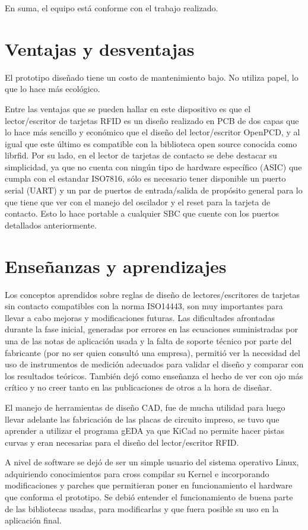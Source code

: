 En suma, el equipo está conforme con el trabajo realizado.


\section{Ventajas y desventajas}
El prototipo diseñado tiene un costo de mantenimiento bajo. No utiliza papel, lo que lo hace más ecológico.

Entre las ventajas que se pueden hallar en este dispositivo es que el lector/escritor de tarjetas RFID es un diseño realizado en PCB de dos capas que lo hace más sencillo y económico que el diseño del lector/escritor OpenPCD, y al igual que este último es compatible con la biblioteca open source conocida como librfid.
Por su lado, en el lector de tarjetas de contacto se debe destacar su simplicidad, ya que no cuenta con ningún tipo de hardware específico (ASIC) que cumpla con el estandar ISO7816, sólo es necesario tener disponible un puerto serial (UART) y un par de puertos de entrada/salida de propósito general para lo que tiene que ver con el manejo del oscilador y el reset para la tarjeta de contacto. Esto lo hace portable a cualquier SBC que cuente con los puertos detallados anteriormente.


\section{Enseñanzas y aprendizajes}
Los conceptos aprendidos sobre reglas de diseño de lectores/escritores de 
tarjetas sin contacto compatibles con la norma ISO14443, son muy importantes
para llevar a cabo mejoras y modificaciones futuras. Las dificultades afrontadas
durante la fase inicial, generadas por errores en las ecuaciones suministradas
por una de las notas de aplicación usada y la falta de soporte técnico por
parte del fabricante (por no ser quien consultó una empresa), permitió ver la 
necesidad del uso de instrumentos de medición adecuados para validar el 
diseño y comparar con los resultados teóricos. También dejó como enseñanza el hecho de ver con ojo más crítico y no creer tanto en las publicaciones de otros a la hora de diseñar.

\bigskip
El manejo de herramientas de diseño CAD, fue de mucha utilidad para luego
llevar adelante las fabricación de las placas de circuito impreso, se tuvo que aprender a utilizar el programa gEDA ya que KiCad no permite hacer pistas curvas y eran necesarias para el diseño del lector/escritor RFID.

\bigskip
A nivel de software se dejó de ser un simple usuario del sistema operativo
Linux, adquiriendo conocimientos para cross compilar su Kernel e incorporando
modificaciones y parches que permitieran poner en funcionamiento el hardware
que conforma el prototipo. Se debió entender el funcionamiento de buena parte
de las bibliotecas usadas, para modificarlas y que fuera posible su uso en la 
aplicación final. 

